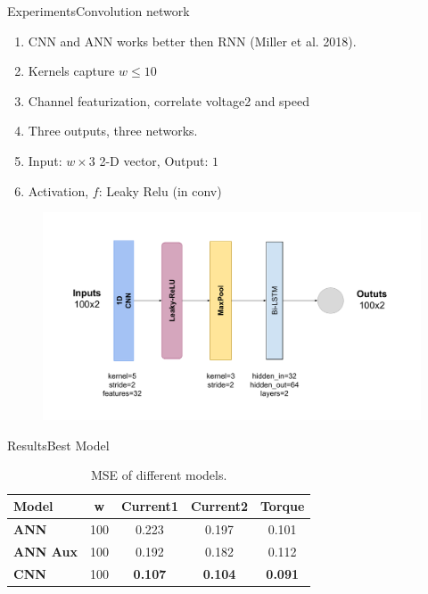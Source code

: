 \documentclass[handout]{beamer}
\begin{document}
\begin{frame}{Experiments}{Convolution network}
  \begin{enumerate}
    \item CNN and ANN works better then RNN (Miller et al. 2018).
    \item Kernels capture $w\leq10$
    \item Channel featurization, correlate voltage2 and speed
    \item Three outputs, three networks.
    \item Input: $w\times3$ 2-D vector, Output: $1$
    \item Activation, $f$: Leaky Relu (in conv)
  \end{enumerate}
  \begin{center}
    \begin{figure}
    \includegraphics[scale=0.35]{images/motor_cnn}
    \end{figure}
  \end{center}
\end{frame}


\begin{frame}{Results}{Best Model}
\begin{table}[]
  \begin{tabular}{l c c c c}
  \toprule[0.2mm]
   \textbf{Model} & \textbf{w} & \textbf{Current1} & \textbf{Current2} & \textbf{Torque}\\
   \midrule
   \textbf{ANN} & 100 & 0.223 & 0.197 & 0.101 \\
   \midrule
   \textbf{ANN Aux} & 100 & 0.192 & 0.182 & 0.112 \\
   \midrule
   \textbf{CNN} & 100 & \textbf{0.107} & \textbf{0.104} & \textbf{0.091} \\
   \bottomrule
  \end{tabular}
  \caption{MSE of different models.}
  \end{table}
\end{frame}
%
\end{document}

